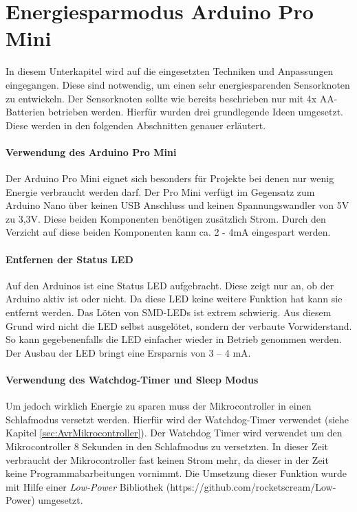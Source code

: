 \section{Energiesparmodus Arduino Pro Mini}
\label{sec:Energiesparmodus}
In diesem Unterkapitel wird auf die eingesetzten Techniken und Anpassungen eingegangen. Diese sind notwendig, um einen sehr energiesparenden Sensorknoten zu entwickeln. Der Sensorknoten sollte wie bereits beschrieben nur mit 4x AA-Batterien betrieben werden. Hierfür wurden drei grundlegende Ideen umgesetzt. Diese werden in den folgenden Abschnitten genauer erläutert. 
\paragraph{Verwendung des Arduino Pro Mini} Der Arduino Pro Mini eignet sich besonders für Projekte bei denen nur wenig Energie verbraucht werden darf. Der Pro Mini verfügt im Gegensatz zum Arduino Nano über keinen USB Anschluss und keinen Spannungswandler von 5V zu 3,3V. Diese beiden Komponenten benötigen zusätzlich Strom. Durch den Verzicht auf diese beiden Komponenten kann ca. 2 - 4mA eingespart werden.
\paragraph{Entfernen der Status LED} Auf den Arduinos ist eine Status LED aufgebracht. Diese zeigt nur an, ob der Arduino aktiv ist oder nicht. Da diese LED keine weitere Funktion hat kann sie entfernt werden. Das Löten von SMD-LEDs ist extrem schwierig. Aus diesem Grund wird nicht die LED selbst ausgelötet, sondern der verbaute Vorwiderstand. So kann gegebenenfalls die LED einfacher wieder in Betrieb genommen werden. Der Ausbau der LED bringt eine Ersparnis von 3 – 4 mA.
\paragraph{Verwendung des  Watchdog-Timer und Sleep Modus} Um jedoch wirklich Energie zu sparen muss der Mikrocontroller in einen Schlafmodus versetzt werden. Hierfür wird der Watchdog-Timer verwendet (siehe Kapitel \ref{sec:AvrMikrocontroller}). Der Watchdog Timer wird verwendet um den Mikrocontroller 8 Sekunden in den Schlafmodus zu versetzten. In dieser Zeit verbraucht der Mikrocontroller fast keinen Strom mehr, da dieser in der Zeit keine Programmabarbeitungen vornimmt. Die Umsetzung dieser Funktion wurde mit Hilfe einer \textit{Low-Power} Bibliothek (https://github.com/rocketscream/Low-Power) umgesetzt.
